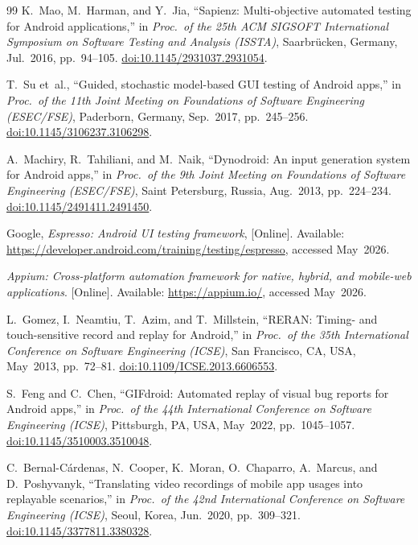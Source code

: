 \documentclass[10pt,conference,a4paper]{IEEEtran}
\begin{document}
\begin{thebibliography}{99}
  K.~Mao, M.~Harman, and Y.~Jia, ``Sapienz: Multi-objective automated
  testing for Android applications,''
  in \emph{Proc.\ of the 25th ACM SIGSOFT International Symposium on
  Software Testing and Analysis (ISSTA)},
  Saarbr\"ucken, Germany, Jul.\ 2016, pp.~94--105.
  \href{https://doi.org/10.1145/2931037.2931054}{doi:10.1145/2931037.2931054}.

  T.~Su et~al., ``Guided, stochastic model-based GUI testing of Android apps,''
  in \emph{Proc.\ of the 11th Joint Meeting on Foundations of Software
  Engineering (ESEC/FSE)}, Paderborn, Germany, Sep.\ 2017,
  pp.~245--256.
  \href{https://doi.org/10.1145/3106237.3106298}{doi:10.1145/3106237.3106298}.

  A.~Machiry, R.~Tahiliani, and M.~Naik,
  ``Dynodroid: An input generation system for Android apps,''
  in \emph{Proc.\ of the 9th Joint Meeting on Foundations of Software
  Engineering (ESEC/FSE)}, Saint Petersburg, Russia, Aug.\ 2013,
  pp.~224--234.
  \href{https://doi.org/10.1145/2491411.2491450}{doi:10.1145/2491411.2491450}.


  Google, \emph{Espresso: Android UI testing framework},
  [Online]. Available:
  \url{https://developer.android.com/training/testing/espresso},
  accessed May~2026.

  \emph{Appium: Cross-platform automation framework for native, hybrid,
  and mobile-web applications}.
  [Online]. Available: \url{https://appium.io/}, accessed May~2026.

  L.~Gomez, I.~Neamtiu, T.~Azim, and T.~Millstein,
  ``RERAN: Timing- and touch-sensitive record and replay for Android,''
  in \emph{Proc.\ of the 35th International Conference on Software
  Engineering (ICSE)}, San Francisco, CA, USA, May~2013, pp.~72--81.
  \href{https://doi.org/10.1109/ICSE.2013.6606553}{doi:10.1109/ICSE.2013.6606553}.


  S.~Feng and C.~Chen,
  ``GIFdroid: Automated replay of visual bug reports for Android apps,''
  in \emph{Proc.\ of the 44th International Conference on Software
  Engineering (ICSE)}, Pittsburgh, PA, USA, May~2022, pp.~1045--1057.
  \href{https://doi.org/10.1145/3510003.3510048}{doi:10.1145/3510003.3510048}.

  C.~Bernal-C\'ardenas, N.~Cooper, K.~Moran, O.~Chaparro, A.~Marcus,
  and D.~Poshyvanyk,
  ``Translating video recordings of mobile app usages into replayable
  scenarios,''
  in \emph{Proc.\ of the 42nd International Conference on Software
  Engineering (ICSE)}, Seoul, Korea, Jun.~2020, pp.~309--321.
  \href{https://doi.org/10.1145/3377811.3380328}{doi:10.1145/3377811.3380328}.

\end{thebibliography}

  
\end{document}
